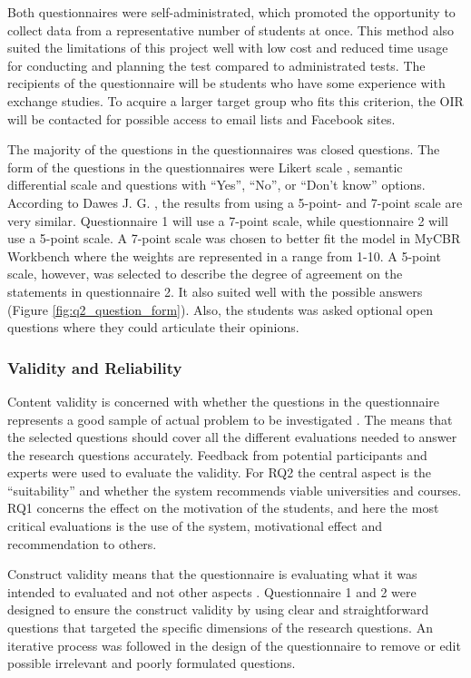 Both questionnaires were self-administrated, which promoted the opportunity to collect data from a representative number of students at once. This method also suited the limitations of this project well with low cost and reduced time usage for conducting and planning the test compared to administrated tests. The recipients of the questionnaire will be students who have some experience with exchange studies. To acquire a larger target group who fits this criterion, the OIR will be contacted for possible access to email lists and Facebook sites.

The majority of the questions in the questionnaires was closed questions. The form of the questions in the questionnaires were Likert scale \cite{allen2007likert}, semantic differential scale \cite{osgood1952nature} and questions with \enquote{Yes}, \enquote{No}, or \enquote{Don't know} options. According to Dawes J. G. \cite{dawes2012data}, the results from using a 5-point- and 7-point scale are very similar. Questionnaire 1 will use a 7-point scale, while questionnaire 2 will use a 5-point scale. A 7-point scale was chosen to better fit the model in MyCBR Workbench where the weights are represented in a range from 1-10. A 5-point scale, however, was selected to describe the degree of agreement on the statements in questionnaire 2. It also suited well with the possible answers (Figure \ref{fig:q2_question_form}). Also, the students was asked optional open questions where they could articulate their opinions.

\subsubsection{Validity and Reliability}
Content validity is concerned with whether the questions in the questionnaire represents a good sample of actual problem to be investigated \cite{oates2005researching}. The means that the selected questions should cover all the different evaluations needed to answer the research questions accurately. Feedback from potential participants and experts were used to evaluate the validity. For RQ2 the central aspect is the \enquote{suitability} and whether the system recommends viable universities and courses. RQ1 concerns the effect on the motivation of the students, and here the most critical evaluations is the use of the system, motivational effect and recommendation to others.

Construct validity means that the questionnaire is evaluating what it was intended to evaluated and not other aspects \cite{oates2005researching}. Questionnaire 1 and 2 were designed to ensure the construct validity by using clear and straightforward questions that targeted the specific dimensions of the research questions. An iterative process was followed in the design of the questionnaire to remove or edit possible irrelevant and poorly formulated questions. 

